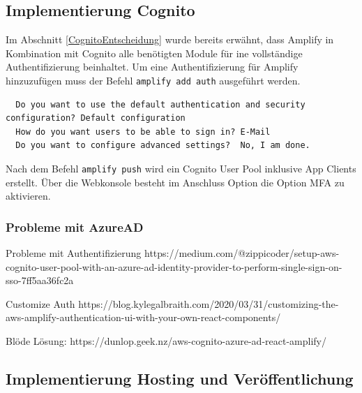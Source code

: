 \subsection{Implementierung Cognito}

Im Abschnitt \ref{CognitoEntscheidung}  wurde bereits erwähnt, dass Amplify in Kombination mit Cognito
alle benötigten Module für ine vollständige Authentifizierung beinhaltet.
Um eine Authentifizierung für Amplify hinzuzufügen muss der Befehl \verb+amplify add auth+ ausgeführt werden.

\begin{verbatim}
  Do you want to use the default authentication and security configuration? Default configuration
  How do you want users to be able to sign in? E-Mail
  Do you want to configure advanced settings?  No, I am done.
\end{verbatim}

Nach dem Befehl \verb+amplify push+ wird ein Cognito User Pool inklusive App Clients erstellt.
Über die Webkonsole besteht im Anschluss Option die Option MFA zu aktivieren.

\subsubsection{Probleme mit AzureAD}

Probleme mit Authentifizierung
https://medium.com/@zippicoder/setup-aws-cognito-user-pool-with-an-azure-ad-identity-provider-to-perform-single-sign-on-sso-7ff5aa36fc2a

Customize Auth
https://blog.kylegalbraith.com/2020/03/31/customizing-the-aws-amplify-authentication-ui-with-your-own-react-components/

Blöde Lösung: https://dunlop.geek.nz/aws-cognito-azure-ad-react-amplify/

\subsection{Implementierung Hosting und Veröffentlichung}
